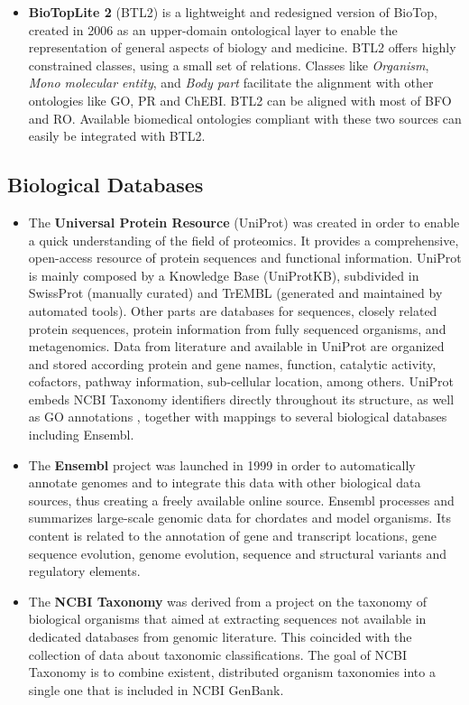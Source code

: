\begin{itemize}
	\item \textbf{BioTopLite 2} (BTL2)\citep{Schulz2013} is a lightweight and redesigned version of BioTop, created in 2006 as an upper-domain ontological layer to enable the representation of general aspects of biology and medicine. BTL2 offers highly constrained classes, using a small set of relations.  Classes like \textit{Organism}, \textit{Mono molecular entity}, and \textit{Body part} facilitate the alignment with other ontologies like GO, PR and ChEBI. BTL2 can be aligned with most of BFO and RO. Available biomedical ontologies compliant with these two sources can easily be integrated with BTL2.

\end{itemize}

\subsection{Biological Databases}
\label{sec:db}
\begin{itemize}
	\item The \textbf{Universal Protein Resource} (UniProt) \citep{UniProtConsortium2014} was created in order to enable a quick understanding of the field of proteomics. It provides a comprehensive, open-access resource of protein sequences and functional information. UniProt is mainly composed by a Knowledge Base (UniProtKB), subdivided in SwissProt (manually  curated) and TrEMBL (generated and maintained by automated tools). Other parts are databases for sequences, closely related protein sequences, protein information from fully sequenced organisms, and metagenomics. 	
	Data from literature and available in UniProt are organized and stored according protein and gene names, function, catalytic activity, cofactors, pathway information, sub-cellular location, among others. UniProt embeds NCBI Taxonomy identifiers directly throughout its structure, as well as GO annotations \citep{Huntley2014}, together with mappings to several biological databases including Ensembl.
	\item The \textbf{Ensembl} \citep{Cunningham2014} project was launched in 1999 in order to automatically annotate genomes and to integrate this data with other biological data sources, thus creating a freely available online source. Ensembl processes and summarizes large-scale genomic data for chordates and model organisms. Its content is related to the annotation of gene and transcript locations, gene sequence evolution, genome evolution, sequence and structural variants and regulatory elements. 
	\item The \textbf{NCBI Taxonomy} \citep{NCBI2015} was derived from a project on the taxonomy of biological organisms that aimed at extracting sequences not available in dedicated databases from genomic literature. This coincided with the collection of data about taxonomic classifications. The goal of NCBI Taxonomy is to combine existent, distributed organism taxonomies into a single one that is included in NCBI GenBank. 
\end{itemize}